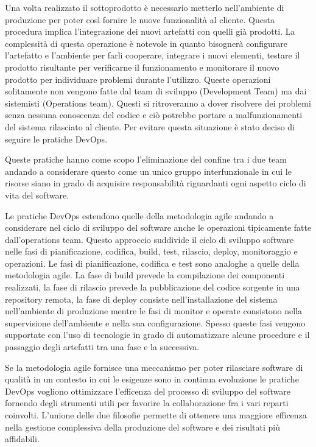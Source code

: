 Una volta realizzato il sottoprodotto è necessario metterlo nell'ambiente di produzione per poter così fornire le nuove funzionalità al cliente.
Questa procedura implica l'integrazione dei nuovi artefatti con quelli già prodotti.
La complessità di questa operazione è notevole in quanto bisognerà configurare l'artefatto e l'ambiente per farli cooperare, integrare i nuovi elementi, testare il prodotto risultante
per verificarne il funzionamento e monitorare il nuovo prodotto per individuare problemi durante l'utilizzo.
Queste operazioni solitamente non vengono fatte dal team di sviluppo (Development Team) ma dai sistemisti (Operations team).
Questi si ritroveranno a dover risolvere dei problemi senza nessuna conoscenza del codice e ciò potrebbe portare a malfunzionamenti del sistema rilasciato al cliente.
Per evitare questa situazione è stato deciso di seguire le pratiche DevOps.

Queste pratiche hanno come scopo l'eliminazione del confine tra i due team andando a considerare questo come un unico gruppo interfunzionale in cui le risorse
siano in grado di acquisire responsabilità riguardanti ogni aspetto ciclo di vita del software.

Le pratiche DevOps estendono quelle della metodologia agile andando a considerare nel ciclo di sviluppo del software
anche le operazioni tipicamente fatte dall'operations team.
Questo approccio suddivide il ciclo di sviluppo software nelle fasi di pianificazione, codifica, build, test, rilascio, deploy, monitoraggio e operazioni.
Le fasi di pianificazione, codifica e test sono analoghe a quelle della metodologia agile. La fase di build prevede la compilazione dei componenti realizzati,
la fase di rilascio prevede la pubblicazione del codice sorgente in una repository remota, la fase di deploy consiste nell'installazione del sistema nell'ambiente di produzione
mentre le fasi di monitor e operate consistono nella supervisione dell'ambiente e nella sua configurazione.
Spesso queste fasi vengono supportate con l'uso di tecnologie in grado di automatizzare alcune procedure e il passaggio degli artefatti tra una fase e la successiva.

Se la metodologia agile fornisce una meccanismo per poter rilasciare software di qualità in un contesto in cui le esigenze sono in continua evoluzione
le pratiche DevOps vogliono ottimizzare l'efficenza del processo di sviluppo del software fornendo degli strumenti utili per favorire la collaborazione fra i vari reparti coinvolti.
L'unione delle due filosofie permette di ottenere una maggiore efficenza nella gestione complessiva della produzione del software e dei risultati più affidabili.

